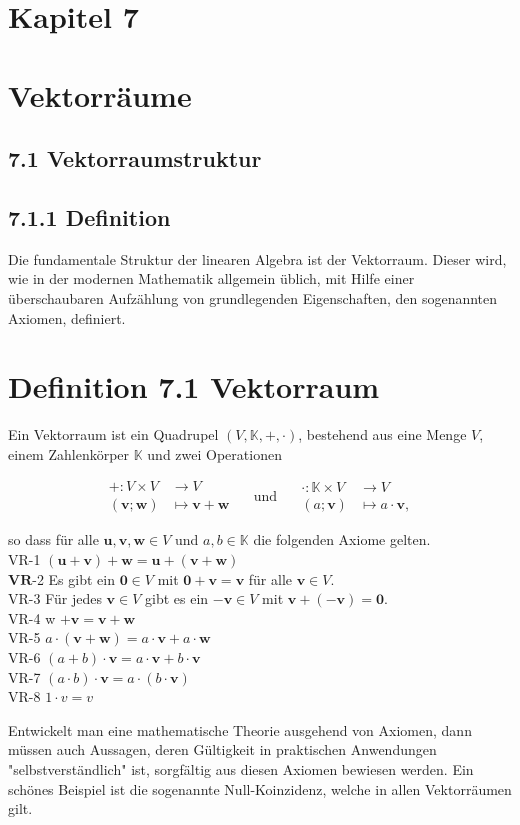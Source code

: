 \documentclass[10pt]{article}
\begin{document}
\section*{Kapitel 7}
\section*{Vektorräume}
\subsection*{7.1 Vektorraumstruktur}
\subsection*{7.1.1 Definition}
Die fundamentale Struktur der linearen Algebra ist der Vektorraum. Dieser wird, wie in der modernen Mathematik allgemein üblich, mit Hilfe einer überschaubaren Aufzählung von grundlegenden Eigenschaften, den sogenannten Axiomen, definiert.

\section*{Definition 7.1 Vektorraum}
Ein Vektorraum ist ein Quadrupel $(V, \mathbb{K},+, \cdot)$, bestehend aus eine Menge $V$, einem Zahlenkörper $\mathbb{K}$ und zwei Operationen


\begin{align*}
+: V \times V & \rightarrow V \\
(\mathbf{v} ; \mathbf{w}) & \mapsto \mathbf{v}+\mathbf{w}
\end{aligned} \quad \text { und } \quad \begin{aligned}
\cdot: \mathbb{K} \times V & \rightarrow V  \tag{7.1}\\
(a ; \mathbf{v}) & \mapsto a \cdot \mathbf{v},
\end{align*}


so dass für alle $\mathbf{u}, \mathbf{v}, \mathbf{w} \in V$ und $a, b \in \mathbb{K}$ die folgenden Axiome gelten.\\
VR-1 $(\mathbf{u}+\mathbf{v})+\mathbf{w}=\mathbf{u}+(\mathbf{v}+\mathbf{w})$\\
$\mathbf{V R}$-2 Es gibt ein $\mathbf{0} \in V$ mit $\mathbf{0}+\mathbf{v}=\mathbf{v}$ für alle $\mathbf{v} \in V$.\\
VR-3 Für jedes $\mathbf{v} \in V$ gibt es ein $-\mathbf{v} \in V$ mit $\mathbf{v}+(-\mathbf{v})=\mathbf{0}$.\\
VR-4 w $+\mathbf{v}=\mathbf{v}+\mathbf{w}$\\
VR-5 $a \cdot(\mathbf{v}+\mathbf{w})=a \cdot \mathbf{v}+a \cdot \mathbf{w}$\\
VR-6 $(a+b) \cdot \mathbf{v}=a \cdot \mathbf{v}+b \cdot \mathbf{v}$\\
VR-7 $(a \cdot b) \cdot \mathbf{v}=a \cdot(b \cdot \mathbf{v})$\\
VR-8 $1 \cdot v=v$

Entwickelt man eine mathematische Theorie ausgehend von Axiomen, dann müssen auch Aussagen, deren Gültigkeit in praktischen Anwendungen "selbstverständlich" ist, sorgfältig aus diesen Axiomen bewiesen werden. Ein schönes Beispiel ist die sogenannte Null-Koinzidenz, welche in allen Vektorräumen gilt.
\end{document}
